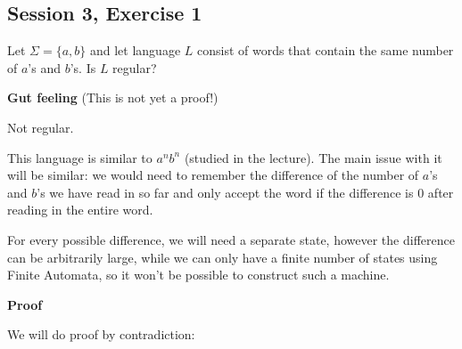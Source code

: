 \subsection{Session 3, Exercise 1}
\label{3f1}


Let $\Sigma = \{a,b\}$ and let language $L$ consist of words
that contain the same number of $a$'s and $b$'s. Is $L$ regular?


\textbf{Gut feeling} (This is not yet a proof!)

Not regular.

This language is similar to $a^nb^n$ (studied in the lecture). The
main issue with it will be similar: we would need to remember the difference
of the number of $a$'s and $b$'s we have read in so far and only
accept the word if the difference is $0$ after reading in the entire
word.

For every possible difference, we will need a separate state, however the
difference can be arbitrarily large, while we can only have a finite
number of states using Finite Automata, so it won't be possible
to construct such a machine.

\textbf{Proof}

We will do proof by contradiction:

